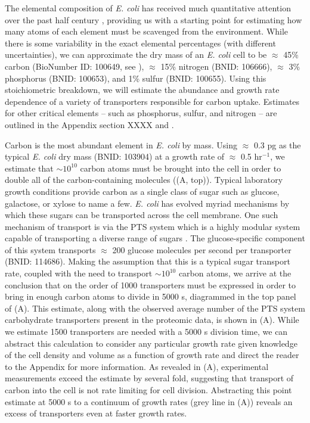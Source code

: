 The elemental composition of \textit{E. coli} has received much quantitative
attention over the past half century \citep{neidhardt1991,
taymaz-nikerel2010, heldal1985, bauer1976}, providing us with a starting
point for estimating how many atoms of each element must be scavenged from
the environment. While there is some variability in the exact elemental
percentages (with different uncertainties), we can approximate the dry mass
of an \textit{E. coli} cell to be $\approx$ 45\% carbon (BioNumber ID:
100649, see ), $\approx$ 15\% nitrogen (BNID: 106666),
$\approx$ 3\% phosphorus (BNID: 100653), and 1\% sulfur (BNID: 100655).
Using this stoichiometric breakdown, we will estimate the abundance and
growth rate dependence of a variety of transporters responsible for carbon
uptake. Estimates for other critical elements -- such as phosphorus, sulfur,
and nitrogen -- are outlined in the Appendix section XXXX and .


Carbon is the most abundant element in \textit{E. coli} by mass.
Using $\approx$ 0.3 pg as the typical \textit{E. coli} dry mass (BNID: 103904)
at a growth rate of $\approx$ 0.5 hr$^{-1}$,
we estimate that $\sim 10^{10}$ carbon atoms must be brought into the cell in
order to double all of the carbon-containing molecules ((A,
top)). Typical laboratory growth conditions provide carbon as a single class of
sugar such as glucose, galactose, or xylose to name a few. \textit{E. coli} has
evolved myriad mechanisms by which these sugars can be transported across the
cell membrane. One such mechanism of transport is via the PTS system which is a
highly modular system capable of transporting a diverse range of sugars
\citep{escalante2012}. The glucose-specific component of this system transports
$\approx$ 200 glucose molecules per second per transporter (BNID: 114686).
Making the assumption that this is a typical sugar transport rate, coupled with
the need to transport $\sim 10^{10}$ carbon atoms, we arrive at the conclusion
that on the order of 1000 transporters must be expressed in order to bring in
enough carbon atoms to divide in 5000 s, diagrammed in the top panel of
(A). This estimate, along with the observed average number of
the PTS system carbohydrate transporters present in the proteomic data, is shown
in (A). While we estimate 1500 transporters are needed with a
5000 s division time, we can abstract this calculation to consider any
particular growth rate given knowledge of the cell density and volume as a
function of growth rate and direct the reader to the Appendix
 for more information. As revealed in
(A), experimental measurements exceed the estimate by several
fold, suggesting that transport of carbon into the cell is not rate limiting for
cell division. Abstracting this point estimate at 5000 s to a continuum of
growth rates (grey line in (A)) reveals an excess of
transporters even at faster growth rates.

